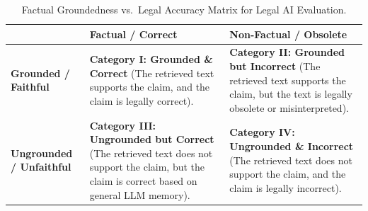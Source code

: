 \documentclass[11pt]{article}
\newcommand{\rev}[1]{#1}
\begin{document}
\vspace*{1cm}
\setcounter{table}{1}

\begin{table}[H]
\caption{\rev{Factual Groundedness vs.\ Legal Accuracy Matrix for Legal AI Evaluation.}
\label{tab:matrix}}
\centering
\small
\begin{tabular}{|l|p{5cm}|p{5cm}|}
\hline
& \textbf{Factual / Correct} & \textbf{Non-Factual / Obsolete} \\ \hline
\textbf{Grounded / Faithful} & \textbf{Category I: Grounded \& Correct} \newline (The retrieved text supports the claim, and the claim is legally correct). & \textbf{Category II: Grounded but Incorrect} \newline (The retrieved text supports the claim, but the text is legally obsolete or misinterpreted). \\ \hline
\textbf{Ungrounded / Unfaithful} & \textbf{Category III: Ungrounded but Correct} \newline (The retrieved text does not support the claim, but the claim is correct based on general LLM memory). & \textbf{Category IV: Ungrounded \& Incorrect} \newline (The retrieved text does not support the claim, and the claim is legally incorrect). \\ \hline
\end{tabular}
\end{table}
\end{document}
